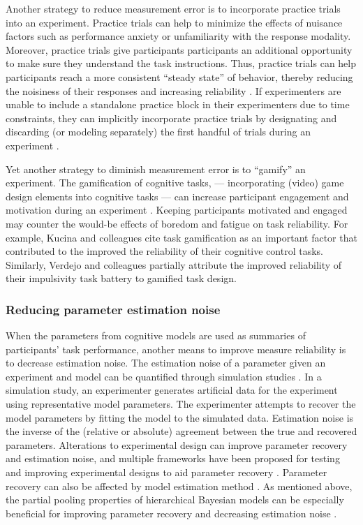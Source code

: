 \documentclass[a4paper,notitlepage,12pt]{article}
\begin{document}
Another strategy to reduce measurement error is to incorporate practice trials into an experiment. Practice trials can help to minimize the effects of nuisance factors such as performance anxiety or unfamiliarity with the response modality. Moreover, practice trials give participants participants an additional opportunity to make sure they understand the task instructions. Thus, practice trials can help participants reach a more consistent ``steady state'' of behavior, thereby reducing the noisiness of their responses and increasing reliability \cite{alexander2003effects}. If experimenters are unable to include a standalone practice block in their experimenters due to time constraints, they can implicitly incorporate practice trials by designating and discarding (or modeling separately) the first handful of trials during an experiment \cite{mclean2018towards}. 

Yet another strategy to diminish measurement error is to ``gamify'' an experiment. The gamification of cognitive tasks, --- incorporating (video) game design elements into cognitive tasks --- can increase participant engagement and motivation during an experiment \cite{sailer2017gamification}. Keeping participants motivated and engaged may counter the would-be effects of boredom and fatigue on task reliability. For example, Kucina and colleagues \cite{kucina2022solution} cite task gamification as an important factor that contributed to the improved the reliability of their cognitive control tasks. Similarly, Verdejo and colleagues \cite{verdejo2021unified} partially attribute the improved reliability of their impulsivity task battery to gamified task design. 

\subsubsection{Reducing parameter estimation noise}

When the parameters from cognitive models are used as summaries of participants' task performance, another means to improve measure reliability is to decrease estimation noise. The estimation noise of a parameter given an experiment and model can be quantified through simulation studies \cite{wilson2019ten, palminteri2017importance}. In a simulation study, an experimenter generates artificial data for the experiment using representative model parameters. The experimenter attempts to recover the model parameters by fitting the model to the simulated data. Estimation noise is the inverse of the (relative or absolute) agreement between the true and recovered parameters. Alterations to experimental design can improve parameter recovery and estimation noise, and multiple frameworks have been proposed for testing and improving experimental designs to aid parameter recovery \cite{broomell2014parameter, melinscak2020computational}. Parameter recovery can also be affected by model estimation method \cite{Lerche2017-yg, waltmann2022sufficient}. As mentioned above, the partial pooling properties of hierarchical Bayesian models can be especially beneficial for improving parameter recovery and decreasing estimation noise \cite{katahira2016hierarchical}.
\end{document}
